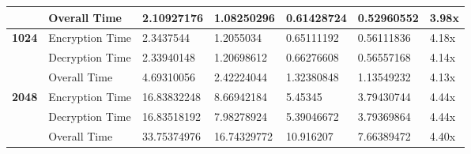 \documentclass[landscape]{article}
\begin{document}
\begin{landscape}
\begin{tabular}{ | l | l | l | l | l | l | l | }
	 & Overall Time & 2.10927176 & 1.08250296 & 0.61428724 & 0.52960552 & 3.98x \\ \hline \hline
	\textbf{1024} & Encryption Time & 2.3437544 & 1.2055034 & 0.65111192 & 0.56111836 & 4.18x \\ \hline
	 & Decryption Time & 2.33940148 & 1.20698612 & 0.66276608 & 0.56557168 & 4.14x \\ \hline
	 & Overall Time & 4.69310056 & 2.42224044 & 1.32380848 & 1.13549232 & 4.13x \\ \hline \hline
	\textbf{2048} & Encryption Time & 16.83832248 & 8.66942184 & 5.45345 & 3.79430744 & 4.44x \\ \hline
	 & Decryption Time & 16.83518192 & 7.98278924 & 5.39046672 & 3.79369864 & 4.44x \\ \hline
	 & Overall Time & 33.75374976 & 16.74329772 & 10.916207 & 7.66389472 & 4.40x \\ \hline
\end{tabular}
\end{landscape} 
\end{document}

